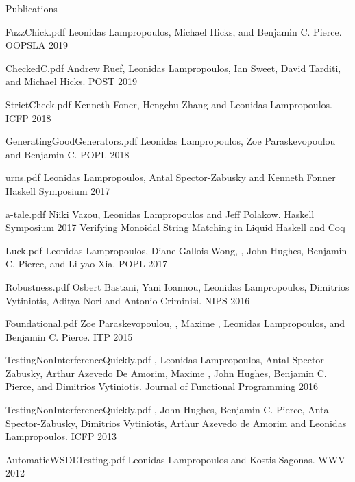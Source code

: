 \documentclass{resume} %
\begin{document}
\begin{rSection}{Publications}

    {FuzzChick.pdf}
    {Leonidas Lampropoulos, Michael Hicks, and Benjamin C. Pierce.}
    {OOPSLA 2019}
    
    {CheckedC.pdf}
    {Andrew Ruef, Leonidas Lampropoulos, Ian Sweet, David Tarditi, and Michael Hicks.}
    {POST 2019}


    {StrictCheck.pdf}
    {Kenneth Foner, Hengchu Zhang and Leonidas Lampropoulos.}
    {ICFP 2018}

    {GeneratingGoodGenerators.pdf}
    {Leonidas Lampropoulos, Zoe Paraskevopoulou and Benjamin C.}
    {POPL 2018}

    {urns.pdf}
    {Leonidas Lampropoulos, Antal Spector-Zabusky and Kenneth Fonner}
    {Haskell Symposium 2017}


    {a-tale.pdf}
    {Niiki Vazou, Leonidas Lampropoulos and Jeff Polakow.}
    {Haskell Symposium 2017}
    {Verifying Monoidal String Matching in Liquid Haskell and Coq}

    {Luck.pdf}
    {Leonidas Lampropoulos, Diane Gallois-Wong, \Catalin \Hritcu, John Hughes, Benjamin C. Pierce, and Li-yao Xia.}
    {POPL 2017}


    {Robustness.pdf}
    {Osbert Bastani, Yani Ioannou, Leonidas Lampropoulos, Dimitrios Vytiniotis, Aditya Nori and Antonio Criminisi.}
    {NIPS 2016}


    {Foundational.pdf}
    {Zoe Paraskevopoulou, \Catalin \Hritcu, Maxime \Denes, Leonidas Lampropoulos, and Benjamin C. Pierce.}
    {ITP 2015}

    {TestingNonInterferenceQuickly.pdf}
    {\Catalin \Hritcu, Leonidas Lampropoulos, Antal Spector-Zabusky, Arthur
    Azevedo De Amorim, Maxime \Denes, John Hughes, Benjamin C. Pierce, and Dimitrios
    Vytiniotis.}
    {Journal of Functional Programming 2016}

    {TestingNonInterferenceQuickly.pdf}
    {\Catalin \Hritcu, John Hughes, Benjamin C. Pierce, Antal
      Spector-Zabusky, Dimitrios Vytiniotis, Arthur Azevedo de Amorim
      and Leonidas Lampropoulos.}
    {ICFP 2013}

    {AutomaticWSDLTesting.pdf}
    {Leonidas Lampropoulos and Kostis Sagonas.}
    {WWV 2012}
   
\end{rSection}
\end{document}

